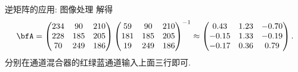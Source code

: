 \begin{frame}{逆矩阵的应用: 图像处理\noexer}
	\onslide<+->
	解得
	\[\bfA=\begin{pmatrix}
		234&90&210\\
		228&185&205\\
		70&249&186
	\end{pmatrix}\begin{pmatrix}
		59&90&210\\
		181&185&205\\
		19&249&186
	\end{pmatrix}^{-1}
	\approx\begin{pmatrix}
		0.43&1.23&-0.70\\
		-0.15&1.33&-0.19\\
		-0.17&0.36&0.79
	\end{pmatrix}.\]
	\onslide<+->
	分别在通道混合器的红绿蓝通道输入上面三行即可.
	\begin{center}
	\end{center}
\end{frame}



